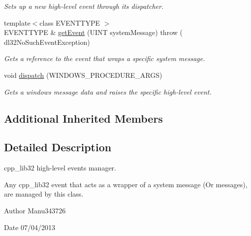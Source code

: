 \begin{DoxyCompactItemize}
\begin{DoxyCompactList}\small\item\em Sets up a new high-\/level event through its dispatcher. \end{DoxyCompactList}\item 
{\footnotesize template$<$class E\-V\-E\-N\-T\-T\-Y\-P\-E $>$ }\\E\-V\-E\-N\-T\-T\-Y\-P\-E \& \hyperlink{classdl32_system_events_manager_a37792022cf7627e804f251f49cc25c70}{get\-Event} (U\-I\-N\-T system\-Message)  throw ( dl32\-No\-Such\-Event\-Exception)
\begin{DoxyCompactList}\small\item\em Gets a reference to the event that wraps a specific system message. \end{DoxyCompactList}\item 
void \hyperlink{classdl32_system_events_manager_ae291bc5c48f2b46c0d06d7e69cf084c7}{dispatch} (W\-I\-N\-D\-O\-W\-S\-\_\-\-P\-R\-O\-C\-E\-D\-U\-R\-E\-\_\-\-A\-R\-G\-S)
\begin{DoxyCompactList}\small\item\em Gets a windows message data and raises the specific high-\/level event. \end{DoxyCompactList}\end{DoxyCompactItemize}
\subsection*{Additional Inherited Members}


\subsection{Detailed Description}
cpp\-\_\-lib32 high-\/level events manager. 

Any cpp\-\_\-lib32 event that acts as a wrapper of a system message (Or messages), are managed by this class.

\begin{DoxyAuthor}{Author}
Manu343726 
\end{DoxyAuthor}
\begin{DoxyDate}{Date}
07/04/2013 
\end{DoxyDate}


